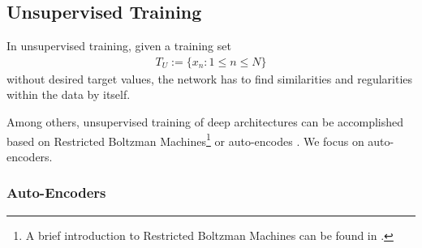 \subsection{Unsupervised Training}
\label{subsec:unsupervised-training}

In unsupervised training, given a training set
\begin{align}
	T_U := \{x_n : 1 \leq n \leq N\}
\end{align}
without desired target values, the network has to find similarities and regularities within the data by itself.


Among others, unsupervised training of deep architectures can be accomplished based on Restricted Boltzman Machines\footnote{A brief introduction to Restricted Boltzman Machines can be found in \cite{Bengio:2009}.} or auto-encodes \cite{Bengio:2009}. We focus on auto-encoders.

\subsubsection{Auto-Encoders}
\label{subsubsec:auto-encoders}


